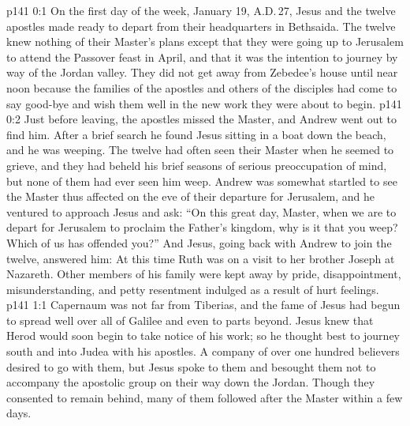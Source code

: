 \author{Midwayer Commission}
\vs p141 0:1 On the first day of the week, January 19, A.D.\,27, Jesus and the twelve apostles made ready to depart from their headquarters in Bethsaida. The twelve knew nothing of their Master’s plans except that they were going up to Jerusalem to attend the Passover feast in April, and that it was the intention to journey by way of the Jordan valley. They did not get away from Zebedee’s house until near noon because the families of the apostles and others of the disciples had come to say good\hyp{}bye and wish them well in the new work they were about to begin.
\vs p141 0:2 Just before leaving, the apostles missed the Master, and Andrew went out to find him. After a brief search he found Jesus sitting in a boat down the beach, and he was weeping. The twelve had often seen their Master when he seemed to grieve, and they had beheld his brief seasons of serious preoccupation of mind, but none of them had ever seen him weep. Andrew was somewhat startled to see the Master thus affected on the eve of their departure for Jerusalem, and he ventured to approach Jesus and ask: “On this great day, Master, when we are to depart for Jerusalem to proclaim the Father’s kingdom, why is it that you weep? Which of us has offended you?” And Jesus, going back with Andrew to join the twelve, answered him:  At this time Ruth was on a visit to her brother Joseph at Nazareth. Other members of his family were kept away by pride, disappointment, misunderstanding, and petty resentment indulged as a result of hurt feelings.
\vs p141 1:1 Capernaum was not far from Tiberias, and the fame of Jesus had begun to spread well over all of Galilee and even to parts beyond. Jesus knew that Herod would soon begin to take notice of his work; so he thought best to journey south and into Judea with his apostles. A company of over one hundred believers desired to go with them, but Jesus spoke to them and besought them not to accompany the apostolic group on their way down the Jordan. Though they consented to remain behind, many of them followed after the Master within a few days.
